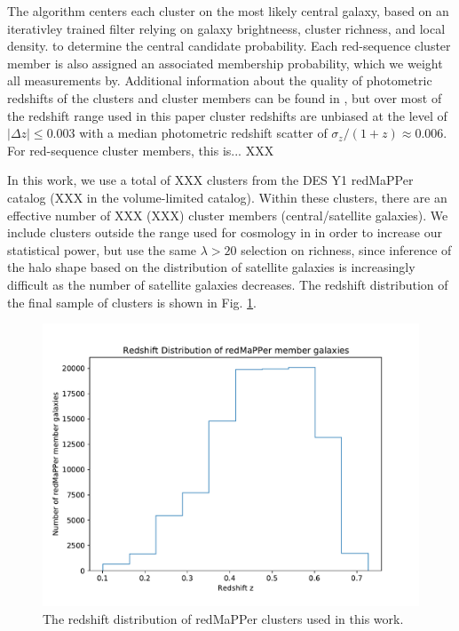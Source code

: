 \documentclass[fleqn,usenatbib]{mnras}
\begin{document}
The algorithm centers each cluster on the most likely central galaxy, based on an iterativley trained filter relying on galaxy brightneess, cluster richness, and local density. to determine the central candidate probability. Each red-sequence cluster member is also assigned an associated membership probability, which we weight all measurements by. Additional information about the quality of photometric redshifts of the clusters and cluster members can be found in \cite{2019MNRAS.482.1352M,wthetapaper}, but over most of the redshift range used in this paper cluster redshifts are unbiased at the level of $|\Delta z| \leq 0.003$ with a median photometric redshift scatter of $\sigma_z/(1+z)\approx 0.006$. For red-sequence cluster members, this is... XXX

In this work, we use a total of XXX clusters from the DES Y1 redMaPPer catalog (XXX in the volume-limited catalog). Within these clusters, there are an effective number of XXX (XXX) cluster members (central/satellite galaxies). We include clusters outside the range used for cosmology in \cite{2020arXiv200211124D} in order to increase our statistical power, but use the same $\lambda>20$ selection on richness, since inference of the halo shape based on the distribution of satellite galaxies is increasingly difficult as the number of satellite galaxies decreases. The redshift distribution of the final sample of clusters is shown in Fig. \ref{fig:zdist}.



\begin{figure}
\begin{center}
\includegraphics[width=\columnwidth]{z_hist.pdf}
\end{center}
\caption[]{The redshift distribution of redMaPPer clusters used in this work.
\label{fig:zdist}}
\end{figure}
\end{document}

